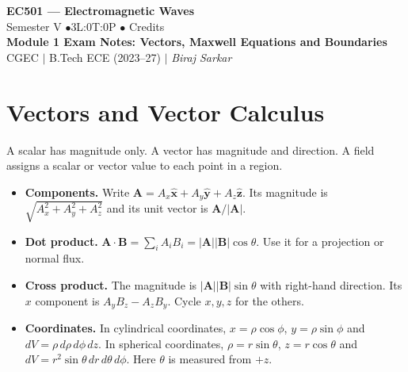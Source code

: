 \documentclass[12pt,a4paper]{article}
\begin{document}

\begin{center}
  {\LARGE\bfseries\color{myred} EC501 --- Electromagnetic Waves}\\[5pt]
  {\normalsize\color{mydark} Semester V \quad$\bullet$\quad 3L:0T:0P \quad$\bullet$ Credits}\\[3pt]
  {\normalsize\color{myteal}\textbf{Module 1 Exam Notes: Vectors, Maxwell Equations and Boundaries}}\\[3pt]
  {\small\color{mydark} CGEC \;$|$\; B.Tech ECE (2023--27) \;$|$\; \textit{Biraj Sarkar}}
\end{center}
\vspace{2pt}
\noindent{\color{myred}\rule{\linewidth}{1.5pt}}
\vspace{2pt}

\hypersetup{linkcolor=mydark}
\tableofcontents
\hypersetup{linkcolor=myteal}
\newpage

\section{Vectors and Vector Calculus}
\begin{tcolorbox}[defbox,title={Scalars, vectors and fields}]
A scalar has magnitude only. A vector has magnitude and direction. A field assigns a scalar or vector value to each point in a region.
\end{tcolorbox}
\begin{itemize}[leftmargin=*,itemsep=3pt]
\item \textbf{Components.} Write $\mathbf A=A_x\hat{\mathbf x}+A_y\hat{\mathbf y}+A_z\hat{\mathbf z}$. Its magnitude is $\sqrt{A_x^2+A_y^2+A_z^2}$ and its unit vector is $\mathbf A/|\mathbf A|$.
\item \textbf{Dot product.} $\mathbf A\cdot\mathbf B=\sum_i A_i B_i=|\mathbf A||\mathbf B|\cos\theta$. Use it for a projection or normal flux.
\item \textbf{Cross product.} The magnitude is $|\mathbf A||\mathbf B|\sin\theta$ with right-hand direction. Its $x$ component is $A_yB_z-A_zB_y$. Cycle $x,y,z$ for the others.
\item \textbf{Coordinates.} In cylindrical coordinates, $x=\rho\cos\phi$, $y=\rho\sin\phi$ and $dV=\rho\,d\rho\,d\phi\,dz$. In spherical coordinates, $\rho=r\sin\theta$, $z=r\cos\theta$ and $dV=r^2\sin\theta\,dr\,d\theta\,d\phi$. Here $\theta$ is measured from $+z$.
\end{itemize}
\end{document}
